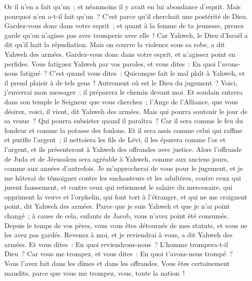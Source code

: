 \begin{multicols}{2}
Or il n'en a fait qu'un~; et néanmoins il y avait en lui abondance d'esprit. Mais pourquoi n'en a-t-il fait qu'un~? C'est parce qu'il cherchait une postérité de Dieu. Gardez-vous donc dans votre esprit~; et quant à la femme de ta jeunesse, prenez garde qu'on n'agisse pas avec tromperie avec elle~!
Car Yahweh, le Dieu d'Israël a dit qu'il hait la répudiation. Mais on couvre la violence sous sa robe, a dit Yahweh des armées. Gardez-vous donc dans votre esprit, et n'agissez point en perfides.
Vous fatiguez Yahweh par vos paroles, et vous dites~: En quoi l'avons-nous fatigué~? C'est quand vous dites~: Quiconque fait le mal plaît à Yahweh, et il prend plaisir à de tels gens~! Autrement où est le Dieu du jugement~?
\VerseOne{}Voici, j'enverrai mon messager~; il préparera le chemin devant moi. Et soudain entrera dans son temple le Seigneur que vous cherchez~; l'Ange de l'Alliance, que vous désirez, voici, il vient, dit Yahweh des armées.
Mais qui pourra soutenir le jour de sa venue~? Qui pourra subsister quand il paraîtra~? Car il sera comme le feu du fondeur et comme la potasse des foulons.
Et il sera assis comme celui qui raffine et purifie l'argent~; il nettoiera les fils de Lévi, il les épurera comme l'or et l'argent, et ils présenteront à Yahweh des offrandes avec justice.
Alors l'offrande de Juda et de Jérusalem sera agréable à Yahweh, comme aux anciens jours, comme aux années d'autrefois.
Je m'approcherai de vous pour le jugement, et je me hâterai de témoigner contre les enchanteurs et les adultères, contre ceux qui jurent faussement, et contre ceux qui retiennent le salaire du mercenaire, qui oppriment la veuve et l'orphelin, qui font tort à l'étranger, et qui ne me craignent point, dit Yahweh des armées.
Parce que je suis Yahweh et que je n'ai point changé~; à cause de cela, enfants de Jacob, vous n'avez point été consumés.
Depuis le temps de vos pères, vous vous êtes détournés de mes statuts, et vous ne les avez pas gardés. Revenez à moi, et je reviendrai à vous, a dit Yahweh des armées. Et vous dites~: En quoi reviendrons-nous~?
L'homme trompera-t-il Dieu~? Car vous me trompez, et vous dites~: En quoi t'avons-nous trompé~? Vous l'avez fait dans les dîmes et dans les offrandes.
Vous êtes certainement maudits, parce que vous me trompez, vous, toute la nation~!

\end{multicols}
